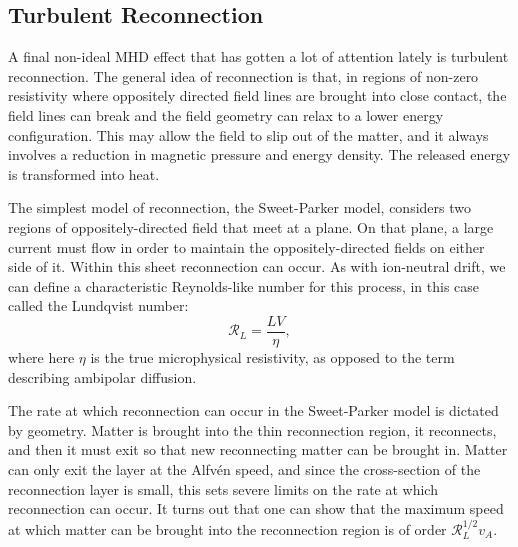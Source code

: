 \subsection{Turbulent Reconnection}

A final non-ideal MHD effect that has gotten a lot of attention lately is turbulent reconnection. The general idea of reconnection is that, in regions of non-zero resistivity where oppositely directed field lines are brought into close contact, the field lines can break and the field geometry can relax to a lower energy configuration. This may allow the field to slip out of the matter, and it always involves a reduction in magnetic pressure and energy density. The released energy is transformed into heat.

The simplest model of reconnection, the Sweet-Parker model, considers two regions of oppositely-directed field that meet at a plane. On that plane, a large current must flow in order to maintain the oppositely-directed fields on either side of it. Within this sheet reconnection can occur. As with ion-neutral drift, we can define a characteristic Reynolds-like number for this process, in this case called the Lundqvist number:
\begin{equation}
\mathcal{R}_L = \frac{LV}{\eta},
\end{equation}
where here $\eta$ is the true microphysical resistivity, as opposed to the term describing ambipolar diffusion.

The rate at which reconnection can occur in the Sweet-Parker model is dictated by geometry. Matter is brought into the thin reconnection region, it reconnects, and then it must exit so that new reconnecting matter can be brought in. Matter can only exit the layer at the Alfv\'{e}n speed, and since the cross-section of the reconnection layer is small, this sets severe limits on the rate at which reconnection can occur. It turns out that one can show that the maximum speed at which matter can be brought into the reconnection region is of order $\mathcal{R}_L^{1/2} v_A$.

